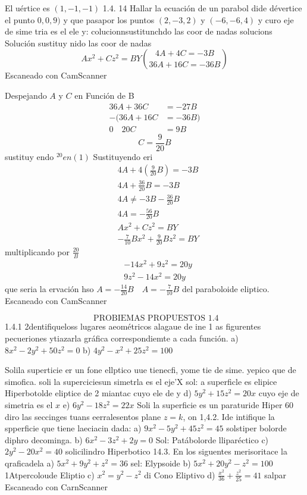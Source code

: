 El uértice es $(1,-1,-1)$
1.4. 14 Hallar la ecuación de un parabol dide dévertice el punto $0,0,9)$ y que pasapor los puntos $(2,-3,2)$ y $(-6,-6,4)$ y curo
eje de sime tria es el ele y: colucionnsustitunchdo las coor de nadas
solucions
Solución sustituy nido las coor de nadas
$$
A x^2+C z^2=B Y\binom{4 A+4 C=-3 B}{36 A+16 C=-36 B}
$$
Escaneado con CamScanner




Despejando $A$ y $C$ en Función de B
$$
\begin{aligned}
	36 A+36 C & =-27 B \\
	-(36 A+16 C & =-36 B) \\
	\hline 0 \quad 20 C & =9 B
\end{aligned}
$$
$$
C=\frac{9}{20} B
$$
sustituy endo ${ }^{20} e n(1)$
Sustituyendo eri
$$
\begin{aligned}
	& 4 A+4\left(\frac{9}{20} B\right)=-3 B \\
	& 4 A+\frac{36}{20} B=-3 B \\
	& 4 A \neq-3 B-\frac{36}{20} B \\
	& 4 A=-\frac{56}{20} B
\end{aligned}
$$
$$
\begin{aligned}
	& A x^2+C z^2=B Y \\
	& -\frac{7}{10} B x^2+\frac{9}{20} B z^2=B Y
\end{aligned}
$$
multiplicando por $\frac{20}{B}$
$$
\begin{aligned}
	& -14 x^2+9 z^2=20 y \\
	& 9 z^2-14 x^2=20 y
\end{aligned}
$$ que seria la ervación hso
$A=-\frac{14}{20} B \quad A=-\frac{7}{10} B$ del paraboloide eliptico.
Escaneado con CamScanner




$$
\text { PROBIEMAS PROPUESTOS } 1.4
$$
1.4.1 2dentifiqueloss lugares aeométricos alagaue de ine 1 as figurentes pecueriones ytiazarla gráfica correspondiemte a cada función.
a) $8 x^2-2 y^2+50 z^2=0$
b) $4 y^2-x^2+25 z^2=100$

Solila superticie er un fone
ellptico uue tienecfi,
yome tie de sime. yepico que de simofica.
soli la superciciesun simetrla es el eje'X
sol: a superficle es elipice Hiperbotolde eliptice de 2 miantac cuyo ele de y
d) $5 y^2+15 z^2=20 x$ cuyo eje de simetria es el $x$
e) $6 y^2-18 z^2=22 x$
Soli la superficie es un paraturide Hiper 60 diro las seccinges tuans eerralesentos plane
$z=k$,
on
1,4.2. Ide intifique la spperficie que tiene laeciacin dada:
a) $9 x^2-5 y^2+45 z^2=45$
solstiper bolorde diphro decominga.
b) $6 x^2-3 z^2+2 y=0$
Sol: Patábolorde lliparéctico
c) $2 y^2-20 x^2=40$
solicilindro Hiperbotico
14.3. En los siguentes merisoritace la qraficadela
a) $5 x^2+9 y^2+z^2=36$
sel: Elypsoide
b) $5 x^2+20 y^2-z^2=100$
1Atpercoloude Eliptio
c) $x^2=y^2-z^2$
di Cono Eliptivo
d) $\frac{x^2}{36}+\frac{z^2}{25}=41$
salpar
Escaneado con CarnScanner


